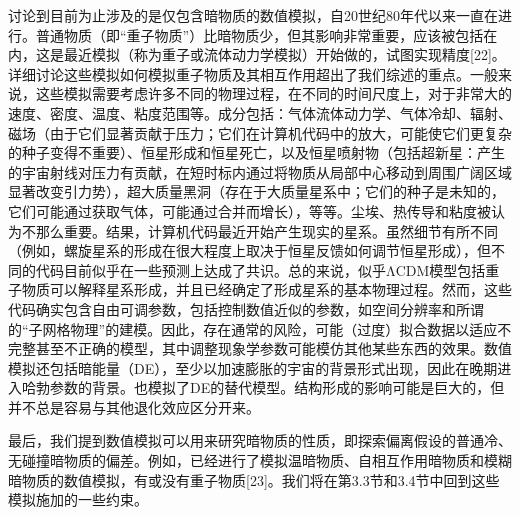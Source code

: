 讨论到目前为止涉及的是仅包含暗物质的数值模拟，自20世纪80年代以来一直在进行。普通物质（即“重子物质”）比暗物质少，但其影响非常重要，应该被包括在内，这是最近模拟（称为重子或流体动力学模拟）开始做的，试图实现精度[22]。详细讨论这些模拟如何模拟重子物质及其相互作用超出了我们综述的重点。一般来说，这些模拟需要考虑许多不同的物理过程，在不同的时间尺度上，对于非常大的速度、密度、温度、粘度范围等。成分包括：气体流体动力学、气体冷却、辐射、磁场（由于它们显著贡献于压力；它们在计算机代码中的放大，可能使它们更复杂的种子变得不重要）、恒星形成和恒星死亡，以及恒星喷射物（包括超新星：产生的宇宙射线对压力有贡献，在短时标内通过将物质从局部中心移动到周围广阔区域显著改变引力势），超大质量黑洞（存在于大质量星系中；它们的种子是未知的，它们可能通过获取气体，可能通过合并而增长），等等。尘埃、热传导和粘度被认为不那么重要。结果，计算机代码最近开始产生现实的星系。虽然细节有所不同（例如，螺旋星系的形成在很大程度上取决于恒星反馈如何调节恒星形成），但不同的代码目前似乎在一些预测上达成了共识。总的来说，似乎ΛCDM模型包括重子物质可以解释星系形成，并且已经确定了形成星系的基本物理过程。然而，这些代码确实包含自由可调参数，包括控制数值近似的参数，如空间分辨率和所谓的“子网格物理”的建模。因此，存在通常的风险，可能（过度）拟合数据以适应不完整甚至不正确的模型，其中调整现象学参数可能模仿其他某些东西的效果。数值模拟还包括暗能量（DE），至少以加速膨胀的宇宙的背景形式出现，因此在晚期进入哈勃参数的背景。也模拟了DE的替代模型。结构形成的影响可能是巨大的，但并不总是容易与其他退化效应区分开来。

最后，我们提到数值模拟可以用来研究暗物质的性质，即探索偏离假设的普通冷、无碰撞暗物质的偏差。例如，已经进行了模拟温暗物质、自相互作用暗物质和模糊暗物质的数值模拟，有或没有重子物质[23]。我们将在第3.3节和3.4节中回到这些模拟施加的一些约束。

 





